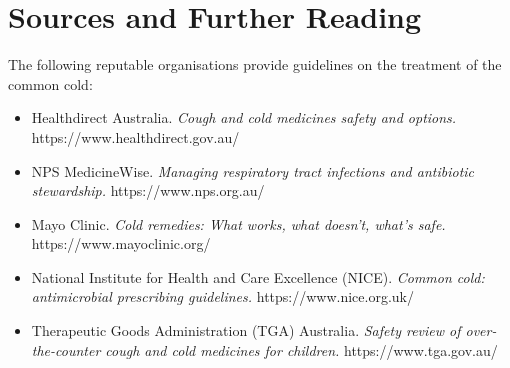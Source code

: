 \section*{Sources and Further Reading}
The following reputable organisations provide guidelines on the treatment of the common cold:
\begin{itemize}
    \item Healthdirect Australia. \textit{Cough and cold medicines safety and options.} https://www.healthdirect.gov.au/
    \item NPS MedicineWise. \textit{Managing respiratory tract infections and antibiotic stewardship.} https://www.nps.org.au/
    \item Mayo Clinic. \textit{Cold remedies: What works, what doesn't, what's safe.} https://www.mayoclinic.org/
    \item National Institute for Health and Care Excellence (NICE). \textit{Common cold: antimicrobial prescribing guidelines.} https://www.nice.org.uk/
    \item Therapeutic Goods Administration (TGA) Australia. \textit{Safety review of over-the-counter cough and cold medicines for children.} https://www.tga.gov.au/
\end{itemize}
